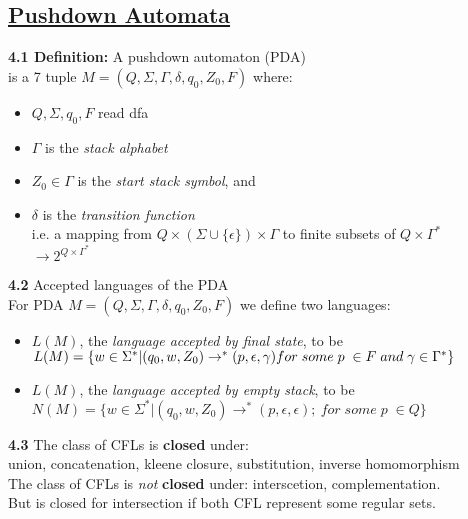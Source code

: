 \documentclass{article}
\begin{document}
\begin{multicols}{2}
\section{\underline{Pushdown Automata}}
\textbf{4.1 Definition:} A pushdown automaton (PDA) \\
is a 7 tuple $M =(Q, \Sigma, \Gamma, \delta, q_0, Z_0, F)$ where:
\begin{itemize}
    \setlength\itemsep{-0.4em}
    \item $Q, \Sigma, q_0, F$ read dfa
    \item $\Gamma$ is the \textit{stack alphabet}
    \item $Z_0 \in \Gamma$ is the \textit{start stack symbol}, and
    \item $\delta$ is the \textit{transition function}\\
        i.e. a mapping from $Q \times (\Sigma \cup \{\epsilon\}) \times \Gamma$ to finite subsets of $Q \times \Gamma^*$\\
        $\rightarrow 2^{Q \times \Gamma^*}$
\end{itemize}
\textbf{4.2} Accepted languages of the PDA\\
For PDA $M =(Q, \Sigma, \Gamma, \delta, q_0, Z_0, F)$  we define two languages:
\begin{itemize}
    \item $L(M)$, the \textit{language accepted by final state}, to be \\
        \begin{math}
            L(M) = 
                \{
                    w \in \Sigma^* | (q_0, w, Z_0) \rightarrow^* (p, \epsilon, \gamma)$\\$
                    for\; some\; p\; \in F\; and\; \gamma \in \Gamma^*
                \}
        \end{math}
    \item $L(M)$, the \textit{language accepted by empty stack}, to be \\
        \begin{math}
            N(M) = 
                \{
                    w \in \Sigma^* | (q_0, w, Z_0) \rightarrow^* (p, \epsilon, \epsilon);\
                    for\; some\; p\; \in Q
                \}
        \end{math}
\end{itemize}

\textbf{4.3} The class of CFLs is \textbf{closed} under:\\
union, concatenation, kleene closure, substitution, inverse homomorphism\\
The class of CFLs is \textit{not} \textbf{closed} under: interscetion, complementation.\\
But is closed for intersection if both CFL represent some regular sets.


\end{multicols}
\end{document}
